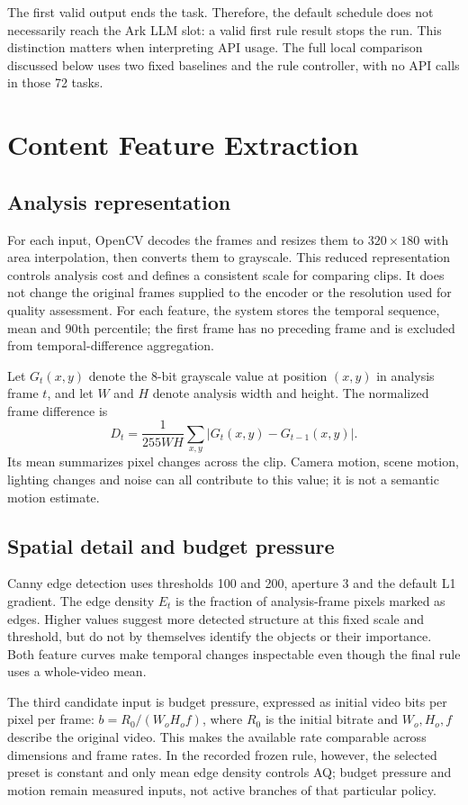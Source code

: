 \documentclass[conference]{IEEEtran}
\begin{document}
The first valid output ends the task. Therefore, the default schedule does not necessarily reach the Ark LLM slot: a valid first rule result stops the run. This distinction matters when interpreting API usage. The full local comparison discussed below uses two fixed baselines and the rule controller, with no API calls in those 72 tasks.

\section{Content Feature Extraction}
\subsection{Analysis representation}
For each input, OpenCV decodes the frames and resizes them to $320\times180$ with area interpolation, then converts them to grayscale. This reduced representation controls analysis cost and defines a consistent scale for comparing clips. It does not change the original frames supplied to the encoder or the resolution used for quality assessment. For each feature, the system stores the temporal sequence, mean and 90th percentile; the first frame has no preceding frame and is excluded from temporal-difference aggregation.

Let $G_t(x,y)$ denote the 8-bit grayscale value at position $(x,y)$ in analysis frame $t$, and let $W$ and $H$ denote analysis width and height. The normalized frame difference is
\begin{equation}
D_t=\frac{1}{255WH}\sum_{x,y}|G_t(x,y)-G_{t-1}(x,y)|.
\end{equation}
Its mean summarizes pixel changes across the clip. Camera motion, scene motion, lighting changes and noise can all contribute to this value; it is not a semantic motion estimate.
\subsection{Spatial detail and budget pressure}
Canny edge detection uses thresholds 100 and 200, aperture 3 and the default L1 gradient. The edge density $E_t$ is the fraction of analysis-frame pixels marked as edges. Higher values suggest more detected structure at this fixed scale and threshold, but do not by themselves identify the objects or their importance. Both feature curves make temporal changes inspectable even though the final rule uses a whole-video mean.

The third candidate input is budget pressure, expressed as initial video bits per pixel per frame: $b=R_0/(W_oH_of)$, where $R_0$ is the initial bitrate and $W_o,H_o,f$ describe the original video. This makes the available rate comparable across dimensions and frame rates. In the recorded frozen rule, however, the selected preset is constant and only mean edge density controls AQ; budget pressure and motion remain measured inputs, not active branches of that particular policy.
\end{document}
